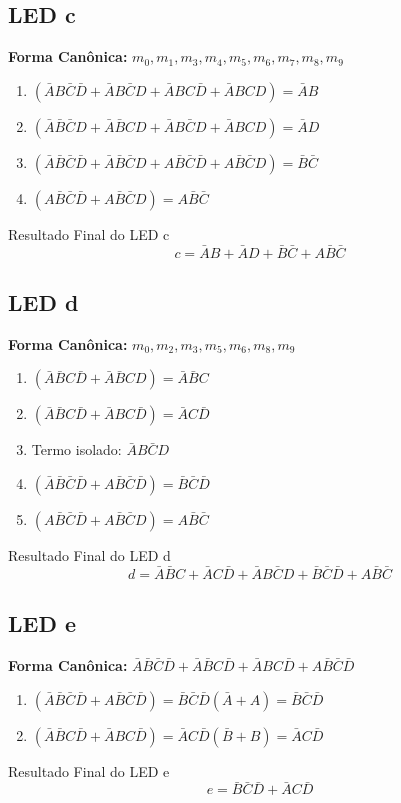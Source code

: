 \documentclass[12pt]{article}
\begin{document}
\subsection*{LED \textbf{c}}
\textbf{Forma Canônica:} $m_0, m_1, m_3, m_4, m_5, m_6, m_7, m_8, m_9$
\begin{enumerate}
    \item $(\bar{A}B\bar{C}\bar{D} + \bar{A}B\bar{C}D + \bar{A}BC\bar{D} + \bar{A}BCD) = \bar{A}B$
    \item $(\bar{A}\bar{B}\bar{C}D + \bar{A}\bar{B}CD + \bar{A}B\bar{C}D + \bar{A}BCD) = \bar{A}D$
    \item $(\bar{A}\bar{B}\bar{C}\bar{D} + \bar{A}\bar{B}\bar{C}D + A\bar{B}\bar{C}\bar{D} + A\bar{B}\bar{C}D) = \bar{B}\bar{C}$
    \item $(A\bar{B}\bar{C}\bar{D} + A\bar{B}\bar{C}D) = A\bar{B}\bar{C}$
\end{enumerate}
\begin{block}{Resultado Final do LED c}
  \[ c = \bar{A}B + \bar{A}D + \bar{B}\bar{C} + A\bar{B}\bar{C} \]
\end{block}

\newpage

\subsection*{LED \textbf{d}}
\textbf{Forma Canônica:} $m_0, m_2, m_3, m_5, m_6, m_8, m_9$
\begin{enumerate}
    \item $(\bar{A}\bar{B}C\bar{D} + \bar{A}\bar{B}CD) = \bar{A}\bar{B}C$
    \item $(\bar{A}\bar{B}C\bar{D} + \bar{A}BC\bar{D}) = \bar{A}C\bar{D}$
    \item Termo isolado: $\bar{A}B\bar{C}D$
    \item $(\bar{A}\bar{B}\bar{C}\bar{D} + A\bar{B}\bar{C}\bar{D}) = \bar{B}\bar{C}\bar{D}$
    \item $(A\bar{B}\bar{C}\bar{D} + A\bar{B}\bar{C}D) = A\bar{B}\bar{C}$
\end{enumerate}
\begin{block}{Resultado Final do LED d}
  \[ d = \bar{A}\bar{B}C + \bar{A}C\bar{D} + \bar{A}B\bar{C}D + \bar{B}\bar{C}\bar{D} + A\bar{B}\bar{C} \]
\end{block}

\subsection*{LED \textbf{e}}
\textbf{Forma Canônica:} $\bar{A}\bar{B}\bar{C}\bar{D} + \bar{A}\bar{B}C\bar{D} + \bar{A}BC\bar{D} + A\bar{B}\bar{C}\bar{D}$
\begin{enumerate}
    \item $(\bar{A}\bar{B}\bar{C}\bar{D} + A\bar{B}\bar{C}\bar{D}) = \bar{B}\bar{C}\bar{D}(\bar{A}+A) = \bar{B}\bar{C}\bar{D}$
    \item $(\bar{A}\bar{B}C\bar{D} + \bar{A}BC\bar{D}) = \bar{A}C\bar{D}(\bar{B}+B) = \bar{A}C\bar{D}$
\end{enumerate}
\begin{block}{Resultado Final do LED e}
  \[ e = \bar{B}\bar{C}\bar{D} + \bar{A}C\bar{D} \]
\end{block}
\end{document}

